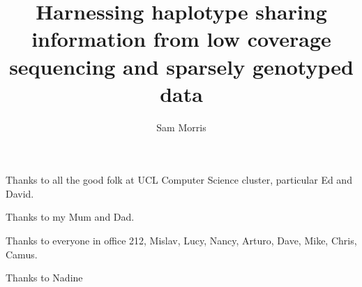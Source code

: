 
\title{Harnessing haplotype sharing information from low coverage sequencing and sparsely genotyped data }
\author{Sam Morris}

\maketitle
\makedeclaration

\begin{abstract} %
\end{abstract}

\begin{acknowledgements}
Thanks to all the good folk at UCL Computer Science cluster, particular Ed and David.

Thanks to my Mum and Dad. 

Thanks to everyone in office 212, Mislav, Lucy, Nancy, Arturo, Dave, Mike, Chris, Camus. 

Thanks to Nadine 
\end{acknowledgements}

\setcounter{tocdepth}{2} 

\tableofcontents
\listoffigures
\listoftables

